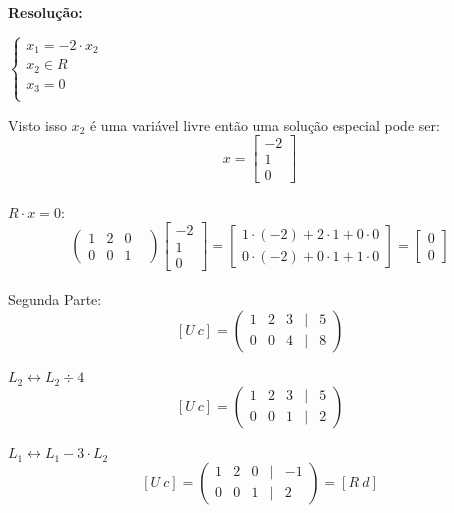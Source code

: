 \documentclass[leqno]{article}
\numberwithin{equation}{section}
\newenvironment{sol}
{
	\vspace{4mm}
	\noindent\textbf{Resolução:}
	\strut\newline
	\smallskip
	\hspace{-3.5mm}
}
{}
\begin{document}
\begin{enumerate}
\begin{sol}
		$
		\left\{
		\begin {array}{cl}
		x_1 = -2\cdot x_2\\
		x_2 \in R\\
		x_3 = 0\\
		\end{array}
		\right.$\\
		\vspace{0.2cm}
		
		
		Visto isso $x_2$ é uma variável livre então uma solução especial pode ser:\\
		$$x= \begin{bmatrix} 
			-2 \\
			1 \\
			0 \end{bmatrix}$$
		\end{sol} \\
		$R \cdot x = 0$:\\
		$$\begin{pmatrix}
			1 & 2 & 0 & \\
			0 & 0 & 1 & 
		\end{pmatrix}
		\begin{bmatrix} 
		-2 \\
		1 \\
		0 \end{bmatrix} = 
		\begin{bmatrix} 
		1 \cdot (-2) + 2 \cdot 1 + 0 \cdot 0 \\
		0 \cdot (-2) + 0 \cdot 1 + 1 \cdot 0 \end{bmatrix} =
		\begin{bmatrix} 
		0\\
		0\end{bmatrix}$$\\
		
		Segunda Parte:\\
		
		$$[U \ c] = \begin{pmatrix}
			1 & 2 & 3 & | & 5 \\
			0 & 0 & 4 & | & 8 
		\end{pmatrix}$$ \\
		$L_2 \leftrightarrow L_2 \div 4$\\
		$$[U \ c] = \begin{pmatrix}
			1 & 2 & 3 & | & 5 \\
			0 & 0 & 1 & | & 2 
		\end{pmatrix}$$\\
		\vspace{0.2cm}
		$L_1 \leftrightarrow L_1 - 3 \cdot L_2$\\
		$$[U \ c] = \begin{pmatrix}
			1 & 2 & 0 & | & -1 \\
			0 & 0 & 1 & | & 2 
		\end{pmatrix} = [R \ d]$$\\
		\vspace{0.2cm}
		

\end{enumerate}
\end{document}
